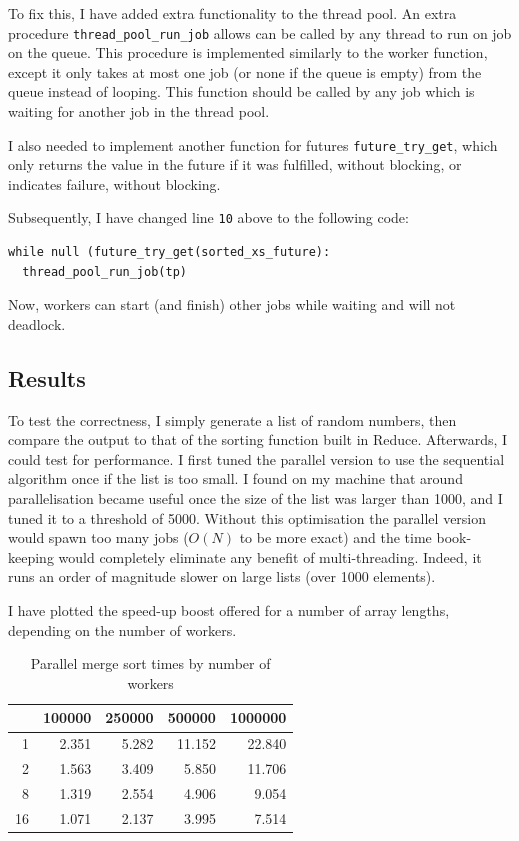 To fix this, I have added extra functionality to the thread pool. An extra procedure \texttt{thread\_pool\_run\_job}
allows can be called by any thread to run on job on the queue. This procedure is implemented similarly
to the worker function, except it only takes at most one job (or none if the queue is empty) from the
queue instead of looping.
This function should be called by any job which is waiting for another job in the thread pool.

I also needed to implement another function for futures \texttt{future\_try\_get}, which only returns the
value in the future if it was fulfilled, without blocking, or indicates failure, without blocking.

Subsequently, I have changed line \texttt{10} above to the following code:
\begin{verbatim}
while null (future_try_get(sorted_xs_future):
  thread_pool_run_job(tp)
\end{verbatim}
Now, workers can start (and finish) other jobs while waiting and will not deadlock.

\subsection{Results}

To test the correctness, I simply generate a list of random numbers, then compare the output
to that of the sorting function built in Reduce. Afterwards, I could test for performance.
I first tuned the parallel version to use the sequential algorithm once if the list is too
small. I found on my machine that around parallelisation became useful once the size of
the list was larger than 1000, and I tuned it to a threshold of 5000. Without this optimisation
the parallel version would spawn too many jobs (\(O(N)\) to be more exact) and the time book-keeping
would completely eliminate any benefit of multi-threading. Indeed, it runs an order of magnitude
slower on large lists (over 1000 elements).

I have plotted the speed-up boost offered for a number of array lengths, depending on the number
of workers.


\begin{table}
\centering
\begin{tabular}{rrrrr}
 & 100000 & 250000 & 500000 & 1000000\\
\hline
1 & 2.351 & 5.282 & 11.152 & 22.840\\
2 & 1.563 & 3.409 & 5.850 & 11.706\\
8 & 1.319 & 2.554 & 4.906 & 9.054\\
16 & 1.071 & 2.137 & 3.995 & 7.514\\
\end{tabular}
\caption{Parallel merge sort times by number of workers}
\label{table:parmergesort}
\end{table}

